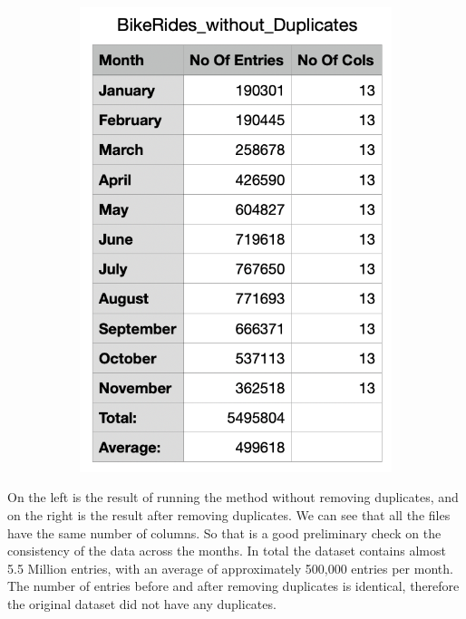 \documentclass[12pt]{article}
\begin{document}
\begin{itemize}
\begin{figure}[h]
\begin{subfigure}{.4\textwidth}
		\includegraphics[scale=0.5]{img3.png}
	\end{subfigure}
	\end{figure}
	
On the left is the result of running the method without removing duplicates, and on the right is the result after removing duplicates. We can see that all the files have the same number of columns. So that is a good preliminary check on the consistency of the data across the months. In total the dataset contains almost 5.5 Million entries, with an average of approximately 500,000 entries per month. The number of entries before and after removing duplicates is identical, therefore the original dataset did not have any duplicates. \\


\end{itemize}
\end{document}
